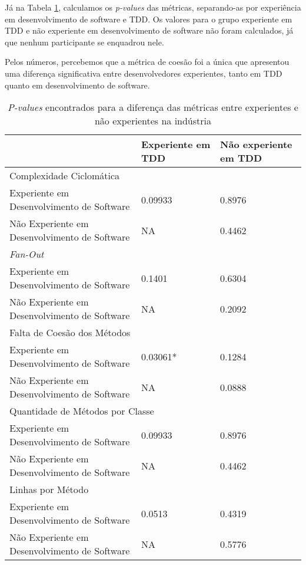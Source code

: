 \documentclass[conference]{IEEEtran}
\begin{document}
Já na Tabela \ref{valores-separados},
calculamos os \textit{p-values} das métricas, separando-as 
por experiência em desenvolvimento de software e TDD. Os valores para o grupo
experiente em TDD e não experiente em desenvolvimento de software não foram calculados, já que nenhum
participante se enquadrou nele.

Pelos números, percebemos 
que a métrica de coesão foi a única que apresentou uma diferença significativa entre desenvolvedores
experientes, tanto em TDD quanto em desenvolvimento de software.

\begin{table}
	\centering
	\begin{tabular}{ | p{3cm} | p{2cm} | p{2cm} | }
		\hline
		  & Experiente em TDD & Não experiente em TDD \\
		\hline
			\multicolumn{3}{|l|}{Complexidade Ciclomática} \\
		\hline
			Experiente em Desenvolvimento de Software 		& 0.09933	&	0.8976\\
			\hline
			Não Experiente em Desenvolvimento de Software 	& NA		&	0.4462\\
		\hline
			\multicolumn{3}{|l|}{\textit{Fan-Out}}\\
		\hline
			Experiente em Desenvolvimento de Software 		& 0.1401	&	0.6304\\
			\hline
			Não Experiente em Desenvolvimento de Software 	& NA		&	0.2092\\
		\hline
			\multicolumn{3}{|l|}{Falta de Coesão dos Métodos}\\
		\hline
			Experiente em Desenvolvimento de Software 		& \cellcolor[gray]{0.8}0.03061*	&	0.1284\\
			\hline
			Não Experiente em Desenvolvimento de Software 	& NA		&	0.0888\\
		\hline
			\multicolumn{3}{|l|}{Quantidade de Métodos por Classe} \\
		\hline
			Experiente em Desenvolvimento de Software 		& 0.09933	&	0.8976\\
			\hline
			Não Experiente em Desenvolvimento de Software 	& NA		&	0.4462\\
		\hline
			\multicolumn{3}{|l|}{Linhas por Método}\\
		\hline
			Experiente em Desenvolvimento de Software 		& 0.0513	&	0.4319\\
			\hline
			Não Experiente em Desenvolvimento de Software 	& NA		&	0.5776\\
		\hline
	\end{tabular}
	\caption{\textit{P-values} encontrados para a diferença das métricas entre experientes e não experientes na indústria}
	\label{valores-separados}
\end{table}
\end{document}
